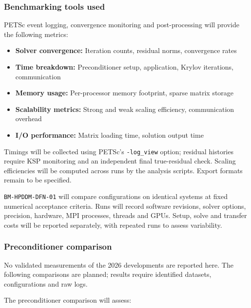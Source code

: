 \subsubsection{Benchmarking tools used}

PETSc event logging, convergence monitoring and post-processing will provide the following metrics:

\begin{itemize}
\item \textbf{Solver convergence:} Iteration counts, residual norms, convergence rates
\item \textbf{Time breakdown:} Preconditioner setup, application, Krylov iterations, communication
\item \textbf{Memory usage:} Per-processor memory footprint, sparse matrix storage
\item \textbf{Scalability metrics:} Strong and weak scaling efficiency, communication overhead
\item \textbf{I/O performance:} Matrix loading time, solution output time
\end{itemize}

Timings will be collected using PETSc's \verb+-log_view+ option; residual histories require KSP monitoring and an independent final true-residual check. Scaling efficiencies will be computed across runs by the analysis scripts. Export formats remain to be specified.

\texttt{BM-HPDDM-DFN-01} will compare configurations on identical systems
at fixed numerical acceptance criteria. Runs will record software revisions,
solver options, precision, hardware, MPI processes, threads and GPUs.
Setup, solve and transfer costs will be reported separately, with repeated
runs to assess variability.



\subsubsection{Preconditioner comparison}

No validated measurements of the 2026 developments are reported here. The following comparisons are
planned; results require identified datasets, configurations and raw logs.

The preconditioner comparison will assess:

